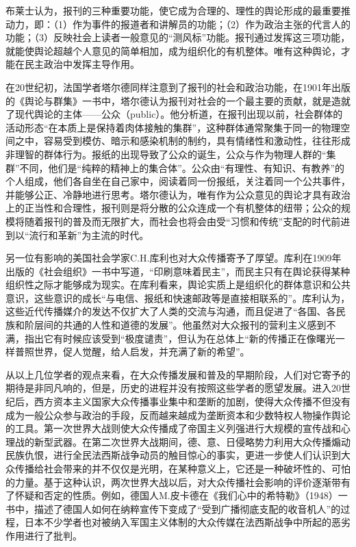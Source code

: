 \documentclass[UTF8,12pt]{ctexart}
\numberwithin{equation}{section} %
\numberwithin{figure}{section}
\numberwithin{table}{section}
\begin{document}
	布莱士认为，报刊的三种重要功能，使它成为合理的、理性的舆论形成的最重要推动力，即：（1）作为事件的报道者和讲解员的功能；（2）作为政治主张的代言人的功能；（3）反映社会上读者一般意见的“测风标”功能。报刊通过发挥这三项功能，就能使舆论超越个人意见的简单相加，成为组织化的有机整体。唯有这种舆论，才能在民主政治中发挥主导作用。
	
	在20世纪初，法国学者塔尔德同样注意到了报刊的社会和政治功能，在1901年出版的《舆论与群集》一书中，塔尔德认为报刊对社会的一个最主要的贡献，就是造就了现代舆论的主体——公众（public）。他分析道，在报刊出现以前，社会群体的活动形态“在本质上是保持着肉体接触的集群”，这种群体通常聚集于同一的物理空间之中，容易受到模仿、暗示和感染机制的制约，具有情绪性和激动性，往往形成非理智的群体行为。报纸的出现导致了公众的诞生，公众与作为物理人群的“集群”不同，他们是“纯粹的精神上的集合体”。公众由“有理性、有知识、有教养”的个人组成，他们各自坐在自己家中，阅读着同一份报纸，关注着同一个公共事件，并能够公正、冷静地进行思考。塔尔德认为，唯有作为公众意见的舆论才具有政治上的正当性和合理性，报刊则是将分散的公众连成一个有机整体的纽带；公众的规模将随着报刊的普及而无限扩大，而社会也将会由受“习惯和传统”支配的时代前进到以“流行和革新”为主流的时代。
	
	另一位有影响的美国社会学家C.H.库利也对大众传播寄予了厚望。库利在1909年出版的《社会组织》一书中写道，“印刷意味着民主”，而民主只有在舆论获得某种组织性之际才能够成为现实。在库利看来，舆论实质上是组织化的群体意识和公共意识，这些意识的成长“与电信、报纸和快速邮政等是直接相联系的”。库利认为，这些近代传播媒介的发达不仅扩大了人类的交流与沟通，而且促进了“各国、各民族和阶层间的共通的人性和道德的发展”。他虽然对大众报刊的营利主义感到不满，指出它有时候应该受到“极度谴责”，但认为在总体上“新的传播正在像曙光一样普照世界，促人觉醒，给人启发，并充满了新的希望”。
	
	从以上几位学者的观点来看，在大众传播发展和普及的早期阶段，人们对它寄予的期待是非同凡响的，但是，历史的进程并没有按照这些学者的愿望发展。进入20世纪后，西方资本主义国家大众传播事业集中和垄断的加剧，使得大众传播不但没有成为一般公众参与政治的手段，反而越来越成为垄断资本和少数特权人物操作舆论的工具。第一次世界大战则使大众传播成了帝国主义列强进行大规模的宣传战和心理战的新型武器。在第二次世界大战期间，德、意、日侵略势力利用大众传播煽动民族仇恨，进行全民法西斯战争动员的触目惊心的事实，更进一步使人们认识到大众传播给社会带来的并不仅仅是光明，在某种意义上，它还是一种破坏性的、可怕的力量。基于这种认识，两次世界大战以后，对大众传播社会影响的评价逐渐带有了怀疑和否定的性质。例如，德国人M.皮卡德在《我们心中的希特勒》（1948）一书中，描述了德国人如何在纳粹宣传下变成了“受到广播彻底支配的收音机人”的过程，日本不少学者也对被纳入军国主义体制的大众传媒在法西斯战争中所起的恶劣作用进行了批判。
	
\end{document}
